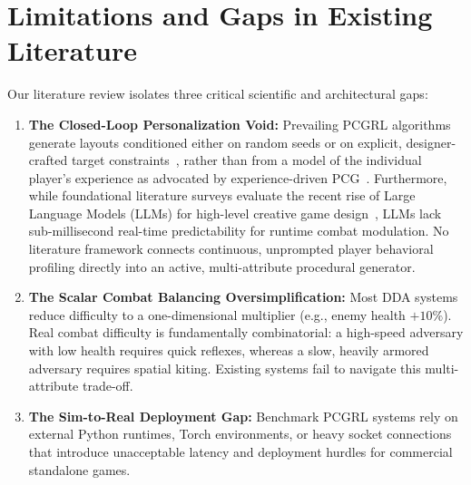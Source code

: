 \section{Limitations and Gaps in Existing Literature}
Our literature review isolates three critical scientific and architectural gaps:
\begin{enumerate}
    \item \textbf{The Closed-Loop Personalization Void:} Prevailing PCGRL algorithms generate layouts conditioned either on random seeds or on explicit, designer-crafted target constraints~\cite{earle2021controllable, earle2024pcgrlplus}, rather than from a model of the individual player's experience as advocated by experience-driven PCG~\cite{yannakakis2011experience}. Furthermore, while foundational literature surveys evaluate the recent rise of Large Language Models (LLMs) for high-level creative game design~\cite{gallotta2024llmsurvey}, LLMs lack sub-millisecond real-time predictability for runtime combat modulation. No literature framework connects continuous, unprompted player behavioral profiling directly into an active, multi-attribute procedural generator.
    \item \textbf{The Scalar Combat Balancing Oversimplification:} Most DDA systems reduce difficulty to a one-dimensional multiplier (e.g., enemy health $+10\%$). Real combat difficulty is fundamentally combinatorial: a high-speed adversary with low health requires quick reflexes, whereas a slow, heavily armored adversary requires spatial kiting. Existing systems fail to navigate this multi-attribute trade-off.
    \item \textbf{The Sim-to-Real Deployment Gap:} Benchmark PCGRL systems rely on external Python runtimes, Torch environments, or heavy socket connections that introduce unacceptable latency and deployment hurdles for commercial standalone games.
\end{enumerate}

